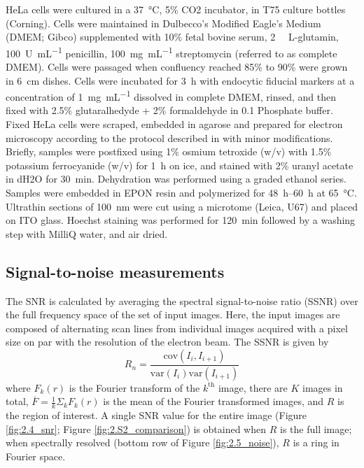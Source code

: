 HeLa cells were cultured in a \SI{37}{\celsius}, 5\% CO2 incubator, in T75 culture bottles (Corning). Cells were maintained in Dulbecco’s Modified Eagle’s Medium (DMEM; Gibco) supplemented with 10\% fetal bovine serum, \SI{2}{\milli\molar} L-glutamin, \SI{100}{U\per\milli\liter} penicillin, \SI{100}{\milli\gram\per\milli\liter} streptomycin (referred to as complete DMEM). Cells were passaged when confluency reached 85\% to 90\% were grown in \SI{6}{\centi\meter} dishes. Cells were incubated for \SI{3}{\hour} with endocytic fiducial markers at a concentration of \SI{1}{\milli\gram\per\milli\liter} dissolved in complete DMEM, rinsed, and then fixed with 2.5\% glutaralhedyde + 2\% formaldehyde in \SI{0.1}{\molar} Phosphate buffer. Fixed HeLa cells were scraped, embedded in agarose and prepared for electron microscopy according to the protocol described in \cite{fokkema2018fluorescently} with minor modifications. Briefly, samples were postfixed using 1\% osmium tetroxide (w/v) with 1.5\% potassium ferrocyanide (w/v) for \SI{1}{\hour} on ice, and stained with 2\% uranyl acetate in dH2O for \SI{30}{\minute}. Dehydration was performed using a graded ethanol series. Samples were embedded in EPON resin and polymerized for \SIrange{48}{60}{\hour} at \SI{65}{\celsius}. Ultrathin sections of \SI{100}{\nano\meter} were cut using a microtome (Leica, U67) and placed on ITO glass. Hoechst staining was performed for \SI{120}{\minute} followed by a washing step with MilliQ water, and air dried.


\subsection{Signal-to-noise measurements}
\label{sec:3.4.3_snr}

The SNR is calculated by averaging the spectral signal-to-noise ratio (SSNR) \cite{unser1987new} over the full frequency space of the set of input images. Here, the input images are composed of alternating scan lines from individual images acquired with a pixel size on par with the resolution of the electron beam. The SSNR is given by
%
\begin{equation}
    R_n = \frac{\text{cov}\left( I_{i}, I_{i+1} \right)}
              {\text{var}\left(I_{i}\right) \text{var}\left(I_{i+1}\right)}
\end{equation}
%
where $F_k(r)$ is the Fourier transform of the $k^{\text{th}}$ image, there are $K$ images in total, $\overline{F}=\frac{1}{k}\Sigma_k F_k(r)$ is the mean of the Fourier transformed images, and $R$ is the region of interest. A single SNR value for the entire image (Figure \ref{fig:2.4_snr}; Figure \ref{fig:2.S2_comparison}) is obtained when $R$ is the full image; when spectrally resolved (bottom row of Figure \ref{fig:2.5_noise}), $R$ is a ring in Fourier space.

